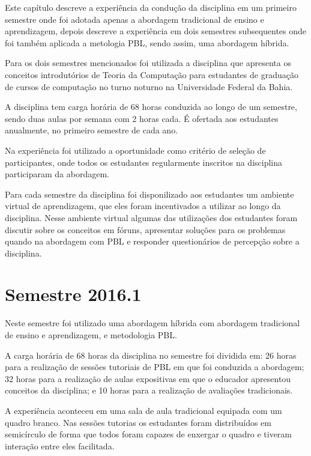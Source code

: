 \label{cap-experiencia}
\acresetall

Este capítulo descreve a experiência da condução da disciplina em um primeiro
semestre onde foi adotada apenas a abordagem tradicional de ensino e aprendizagem,
depois descreve a experiência em dois semestres subsequentes onde foi também aplicada a metologia PBL,
sendo assim, uma abordagem híbrida.

Para os dois semestres mencionados foi utilizada a disciplina que apresenta os
conceitos introdutórios de Teoria da Computação para estudantes de graduação de cursos de computação
no turno noturno na Universidade Federal da Bahia.

A disciplina tem carga horária de 68 horas conduzida ao longo de um semestre, sendo duas
aulas por semana com 2 horas cada.
É ofertada aos estudantes anualmente, no primeiro semestre de cada ano.

Na experiência foi utilizado a oportunidade como critério de seleção de participantes, onde todos os
estudantes regularmente inscritos na disciplina participaram da abordagem.

Para cada semestre da disciplina foi disponilizado aos estudantes um ambiente virtual de aprendizagem,
que eles foram incentivados a utilizar ao longo da disciplina.
Nesse ambiente virtual algumas das utilizações dos estudantes foram discutir sobre os conceitos
em fóruns, apresentar soluções para os problemas quando na abordagem com PBL e responder
questionários de percepção sobre a disciplina.

\section{Semestre 2016.1}

Neste semestre foi utilizado uma abordagem híbrida com abordagem tradicional de ensino
e aprendizagem, e metodologia PBL.

A carga horária de 68 horas da disciplina no semestre foi dividida em:
26 horas para a realização de sessões tutoriais de PBL em que foi conduzida a abordagem;
32 horas para a realização de aulas expositivas em que o educador apresentou conceitos da disciplina;
e 10 horas para a realização de avaliações tradicionais.

A experiência aconteceu em uma sala de aula tradicional equipada com um
quadro branco.
Nas sessões tutorias os estudantes foram distribuídos em semicírculo de forma que todos foram capazes de
enxergar o quadro e tiveram interação entre eles facilitada.

